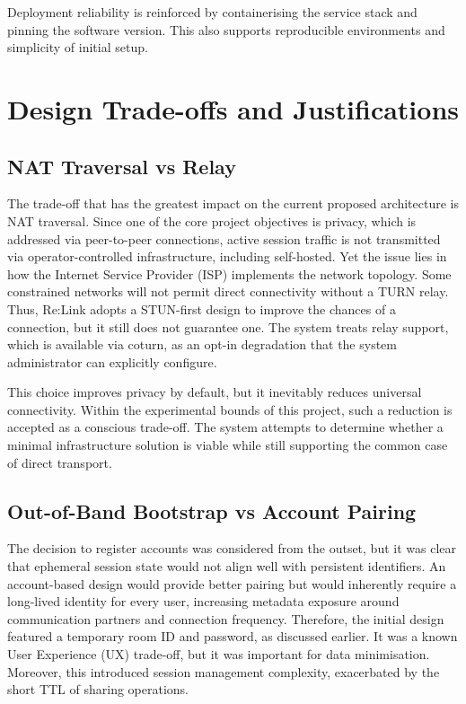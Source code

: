 \documentclass[12pt,a4paper,oneside]{report}
\begin{document}
Deployment reliability is reinforced by containerising the service stack and pinning the software version. This also supports reproducible environments and simplicity of initial setup.


\section{Design Trade-offs and Justifications}
\label{sec:trade-offs}

\subsection{NAT Traversal vs Relay}
\label{sec:nat-vs-relay}

The trade-off that has the greatest impact on the current proposed architecture is NAT traversal. Since one of the core project objectives is privacy, which is addressed via peer-to-peer connections, active session traffic is not transmitted via operator-controlled infrastructure, including self-hosted. Yet the issue lies in how the Internet Service Provider (ISP) implements the network topology. Some constrained networks will not permit direct connectivity without a TURN relay. Thus, Re:Link adopts a STUN-first design to improve the chances of a connection, but it still does not guarantee one. The system treats relay support, which is available via coturn, as an opt-in degradation that the system administrator can explicitly configure.

This choice improves privacy by default, but it inevitably reduces universal connectivity. Within the experimental bounds of this project, such a reduction is accepted as a conscious trade-off. The system attempts to determine whether a minimal infrastructure solution is viable while still supporting the common case of direct transport.


\subsection{Out-of-Band Bootstrap vs Account Pairing}
\label{sec:oob-vs-account}

The decision to register accounts was considered from the outset, but it was clear that ephemeral session state would not align well with persistent identifiers. An account-based design would provide better pairing but would inherently require a long-lived identity for every user, increasing metadata exposure around communication partners and connection frequency. Therefore, the initial design featured a temporary room ID and password, as discussed earlier. It was a known User Experience (UX) trade-off, but it was important for data minimisation. Moreover, this introduced session management complexity, exacerbated by the short TTL of sharing operations.
\end{document}
